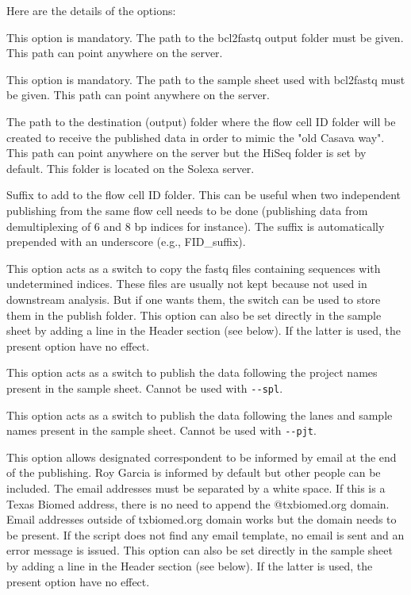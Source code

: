 \documentclass[11pt]{report}
\begin{document}
Here are the details of the options:
\begin{description} [labelindent=2cm]
	\item [\texttt{\textbf{-{}-dir}}:] This option is mandatory. The path to the bcl2fastq output folder must be given. This path can point anywhere on the server.
	\item [\texttt{-{}-ss:}] This option is mandatory. The path to the sample sheet used with bcl2fastq must be given. This path can point anywhere on the server.
	\item [\texttt{-{}-dest:}] The path to the destination (output) folder where the flow cell ID folder will be created to receive the published data in order to mimic the "old Casava way". This path can point anywhere on the server but the HiSeq folder is set by default. This folder is located on the Solexa server.
	\item [\texttt{-{}-app-fid:}] Suffix to add to the flow cell ID folder. This can be useful when two independent publishing from the same flow cell needs to be done (publishing data from demultiplexing of 6 and 8 bp indices for instance). The suffix is automatically prepended with an underscore (e.g., FID\_suffix).
	\item [\texttt{-{}-keep-und:}] This option acts as a switch to copy the fastq files containing sequences with undetermined indices. These files are usually not kept because not used in downstream analysis. But if one wants them, the switch can be used to store them in the publish folder. This option can also be set directly in the sample sheet by adding a line in the Header section (see below). If the latter is used, the present option have no effect.
	\item [\texttt{-{}-pjt:}] This option acts as a switch to publish the data following the project names present in the sample sheet. Cannot be used with \texttt{-{}-spl}.
	\item [\texttt{-{}-spl:}] This option acts as a switch to publish the data following the lanes and sample names present in the sample sheet. Cannot be used with \texttt{-{}-pjt}.
	\item [\texttt{-{}-em:}] This option allows designated correspondent to be informed by email at the end of the publishing. Roy Garcia is informed by default but other people can be included. The email addresses must be separated by a white space. If this is a Texas Biomed address, there is no need to append the @txbiomed.org domain. Email addresses outside of txbiomed.org domain works but the domain needs to be present. If the script does not find any email template, no email is sent and an error message is issued. This option can also be set directly in the sample sheet by adding a line in the Header section (see below). If the latter is used, the present option have no effect.
\end{description}
\end{document}
